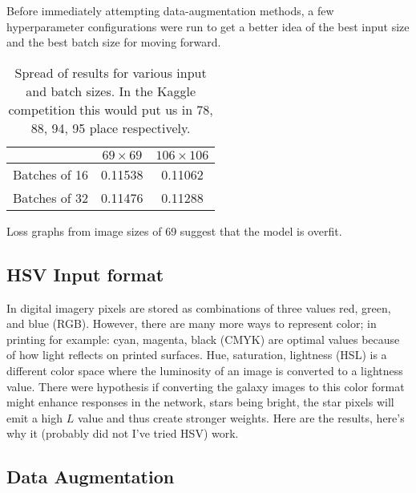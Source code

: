 Before immediately attempting data-augmentation methods, a few hyperparameter configurations were run to get a better idea of the best input size and the best batch size for moving forward.

\begin{table}[]
    \centering
    \begin{tabular}{|r|c|c|}
        \hline
                      & $69 \times 69$ & $106 \times 106$ \\ \hline
        Batches of 16 & 0.11538 & 0.11062 \\ \hline
        Batches of 32 & 0.11476 & 0.11288 \\ \hline
    \end{tabular}
    \caption{Spread of results for various input and batch sizes. In the Kaggle competition this would put us in 78, 88, 94, 95 place respectively.}
    \label{tab:results1}
\end{table}

Loss graphs from image sizes of 69 suggest that the model is overfit.



\subsection{HSV Input format}

In digital imagery pixels are stored as combinations of three values red, green, and blue (RGB). However, there are many more ways to represent color; in printing for example: cyan, magenta, black (CMYK) are optimal values because of how light reflects on printed surfaces. Hue, saturation, lightness (HSL) is a different color space where the luminosity of an image is converted to a lightness value. There were hypothesis if converting the galaxy images to this color format might enhance responses in the network, stars being bright, the star pixels will emit a high $L$ value and thus create stronger weights. Here are the results, here's why it (probably did not I've tried HSV) work.

\subsection{Data Augmentation}

